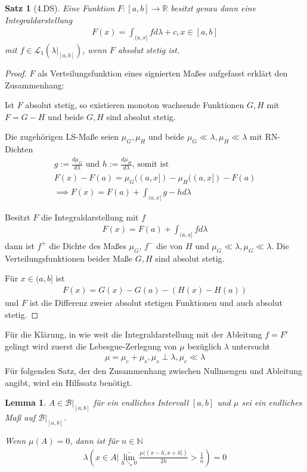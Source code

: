 \documentclass[]{article}
\newtheorem{theorem}{Satz}
\newtheorem{lemma}{Lemma}
\begin{document}
\begin{theorem}[4.DS]
	Eine Funktion $F:[a,b]\rightarrow \mathbb{R}$ besitzt genau dann eine Integraldarstellung
	\begin{align*}
		F(x) = \int_{(a,x]} f d\lambda + c, x \in [a,b]
	\end{align*}
	mit $f \in \mathcal{L}_1(\lambda|_{[a,b]})$, wenn $F$ absolut stetig ist.
\end{theorem}
\begin{proof}
	$F$ als Verteilungsfunktion eines signierten Maßes aufgefasst erklärt den Zusammenhang:
	
	Ist $F$ absolut stetig, so existieren monoton wachsende Funktionen $G,H$ mit $F=G-H$ und beide $G,H$ sind absolut stetig.
	
	Die zugehörigen LS-Maße seien $\mu_G,\mu_H$ und beide $\mu_G \ll \lambda, \mu_H \ll \lambda$ mit RN-Dichten
	\begin{align*}
		g:=\frac{d\mu_G}{d\lambda} \text{ und } h := \frac{d\mu_H}{d\lambda} \text{, somit ist}\\
		F(x) - F(a) = \mu_G((a,x]) - \mu_H((a,x]) - F(a)\\
		\implies F(x) = F(a) + \int_{(a,x]} g-h d\lambda
	\end{align*}

	Besitzt $F$ die Integraldarstellung mit $f$
	\begin{align*}
		F(x) = F(a) + \int_{(a,x]} f d\lambda
	\end{align*}
	dann ist $f^+$ die Dichte des Maßes $\mu_G$, $f^-$ die von $H$ und $\mu_G \ll \lambda, \mu_G \ll \lambda$. Die Verteilungsfunktionen beider Maße $G,H$ sind absolut stetig.
	
	Für $x \in (a,b]$ ist
	\begin{align*}
		F(x) = G(x) - G(a) - (H(x) - H(a))
	\end{align*}
	und $F$ ist die Differenz zweier absolut stetigen Funktionen und auch absolut stetig.
\end{proof}

Für die Klärung, in wie weit die Integraldarstellung mit der Ableitung $f=F'$ gelingt wird zuerst die Lebesgue-Zerlegung von $\mu$ bezüglich $\lambda$ untersucht
\begin{align*}
	\mu = \mu_c + \mu_s, \mu_s \perp \lambda, \mu_c \ll \lambda
\end{align*}
Für folgenden Satz, der den Zusammenhang zwischen Nullmengen und Ableitung angibt, wird ein Hilfssatz benötigt.

\begin{lemma}
	$A \in \mathcal{B}|_{[a,b]}$ für ein endliches Intervall $[a,b]$ und $\mu$ sei ein endliches Maß auf $\mathcal{B}|_{[a,b]}$.
	
	Wenn $\mu(A) = 0$, dann ist für $n \in \mathbb{N}$
	\begin{align*}
		\lambda\left( x\in A \big| \bar{\lim_{h \searrow 0}} \frac{\mu((x-h,x+h])}{2h} > \frac{1}{n} \right) = 0
	\end{align*}
\end{lemma}
\end{document}
